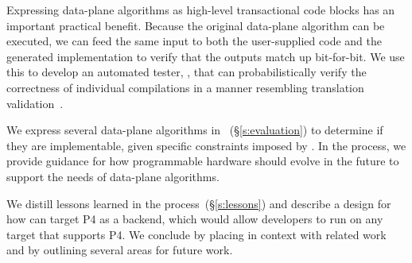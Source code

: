 Expressing data-plane algorithms as high-level transactional code blocks has
an important practical benefit. Because the original data-plane algorithm can
be executed, we can feed the same input to both the user-supplied code and the
generated implementation to verify that the outputs match up bit-for-bit. We
use this to develop an automated tester, \tester , that can probabilistically
verify the correctness of individual compilations in a manner resembling
translation validation~\cite{necula_validation}.

We express several data-plane algorithms in \pktlanguage~(\S\ref{s:evaluation})
to determine if they are implementable, given specific constraints imposed by
\absmachine. In the process, we provide guidance for how programmable hardware
should evolve in the future to support the needs of data-plane algorithms.

We distill lessons learned in the process~(\S\ref{s:lessons}) and describe a
design for how \pktlanguage can target P4 as a backend, which would allow
developers to run \pktlanguage on any target that supports P4. We conclude by
placing \pktlanguage in context with related work and by outlining several
areas for future work.
